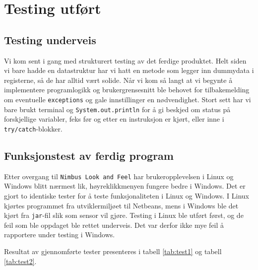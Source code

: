 \section{Testing utført}
\subsection{Testing underveis}
Vi kom sent i gang med strukturert testing av det ferdige produktet. Helt siden vi bare hadde en datastruktur har vi hatt en metode som legger inn dummydata i registerne, så de har alltid vært solide.
Når vi kom så langt at vi begynte å implementere programlogikk og brukergrensesnitt ble behovet for tilbakemelding om eventuelle \texttt{exceptions} og gale innstillinger en nødvendighet. 
Stort sett har vi bare brukt terminal og \texttt{System.out.println} for å gi beskjed om status på forskjellige variabler, feks før og etter en instruksjon er kjørt, eller inne i \texttt{try/catch}-blokker.

\subsection{Funksjonstest av ferdig program}
Etter overgang til \texttt{Nimbus Look and Feel} har brukeropplevelsen i Linux og Windows blitt nærmest lik, høyreklikkmenyen fungere bedre i Windows.
Det er gjort to identiske tester for å teste funksjonaliteten i Linux og Windows. I Linux kjørtes programmet fra utviklermiljøet til Netbeans, mens i Windows ble det kjørt fra \texttt{jar}-fil slik som sensor vil gjøre.
Testing i Linux ble utført først, og de feil som ble oppdaget ble rettet underveis. Det var derfor ikke mye feil å rapportere under testing i Windows.

Resultat av gjennomførte tester presenteres i tabell \ref{tab:test1} og tabell \ref{tab:test2}.

